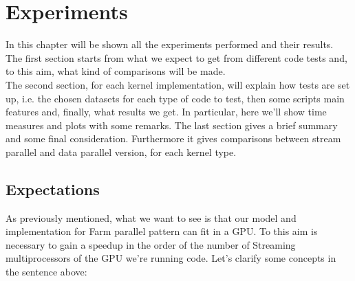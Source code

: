 \chapter{Experiments}
\label{chap:experim}
In this chapter will be shown all the experiments performed and their results. The first section starts from what we expect to get from different code tests and, to this aim, what kind of comparisons will be made.\\
The second section, for each kernel implementation, will explain how tests are set up, i.e. the chosen datasets for each type of code to test, then some scripts main features and, finally, what results we get. In particular, here we'll show time measures and plots with some remarks.
The last section gives a brief summary and some final consideration. Furthermore it gives comparisons between stream parallel and data parallel version, for each kernel type.

\section{Expectations}
As previously mentioned, what we want to see is that our model and implementation for Farm parallel pattern can fit in a GPU.
To this aim is necessary to gain a speedup in the order of the number of Streaming multiprocessors of the GPU we're running code.
Let's clarify some concepts in the sentence above:

